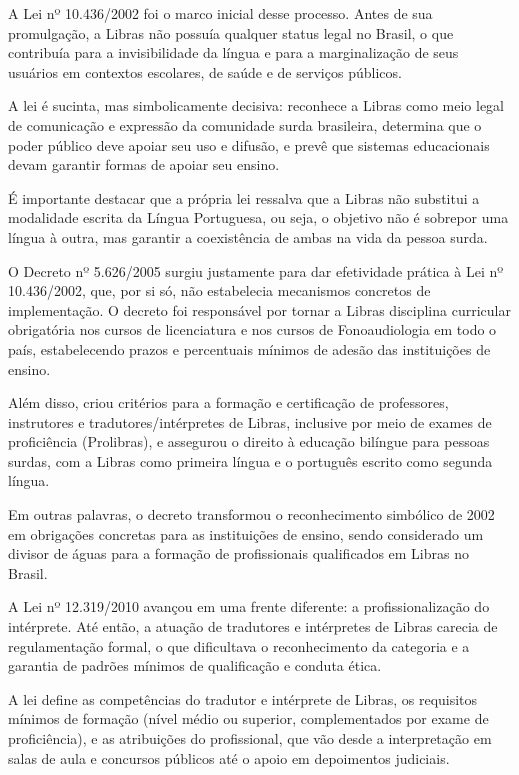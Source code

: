 \documentclass[
    12pt,                %
    openright,           %
    oneside,             %
    a4paper,             %
    english,             %
    brazil               %
]{abntex2}
\begin{document}
A Lei nº 10.436/2002 foi o marco inicial desse processo. Antes de sua promulgação, a Libras não possuía qualquer status legal no Brasil, o que contribuía para a invisibilidade da língua e para a marginalização de seus usuários em contextos escolares, de saúde e de serviços públicos. 

A lei é sucinta, mas simbolicamente decisiva: reconhece a Libras como meio legal de comunicação e expressão da comunidade surda brasileira, determina que o poder público deve apoiar seu uso e difusão, e prevê que sistemas educacionais devam garantir formas de apoiar seu ensino. 

É importante destacar que a própria lei ressalva que a Libras não substitui a modalidade escrita da Língua Portuguesa, ou seja, o objetivo não é sobrepor uma língua à outra, mas garantir a coexistência de ambas na vida da pessoa surda.
 
O Decreto nº 5.626/2005 surgiu justamente para dar efetividade prática à Lei nº 10.436/2002, que, por si só, não estabelecia mecanismos concretos de implementação. O decreto foi responsável por tornar a Libras disciplina curricular obrigatória nos cursos de licenciatura e nos cursos de Fonoaudiologia em todo o país, estabelecendo prazos e percentuais mínimos de adesão das instituições de ensino.

Além disso, criou critérios para a formação e certificação de professores, instrutores e tradutores/intérpretes de Libras, inclusive por meio de exames de proficiência (Prolibras), e assegurou o direito à educação bilíngue para pessoas surdas, com a Libras como primeira língua e o português escrito como segunda língua. 

Em outras palavras, o decreto transformou o reconhecimento simbólico de 2002 em obrigações concretas para as instituições de ensino, sendo considerado um divisor de águas para a formação de profissionais qualificados em Libras no Brasil.
 
A Lei nº 12.319/2010 avançou em uma frente diferente: a profissionalização do intérprete. Até então, a atuação de tradutores e intérpretes de Libras carecia de regulamentação formal, o que dificultava o reconhecimento da categoria e a garantia de padrões mínimos de qualificação e conduta ética. 

A lei define as competências do tradutor e intérprete de Libras, os requisitos mínimos de formação (nível médio ou superior, complementados por exame de proficiência), e as atribuições do profissional, que vão desde a interpretação em salas de aula e concursos públicos até o apoio em depoimentos judiciais. 
\end{document}
